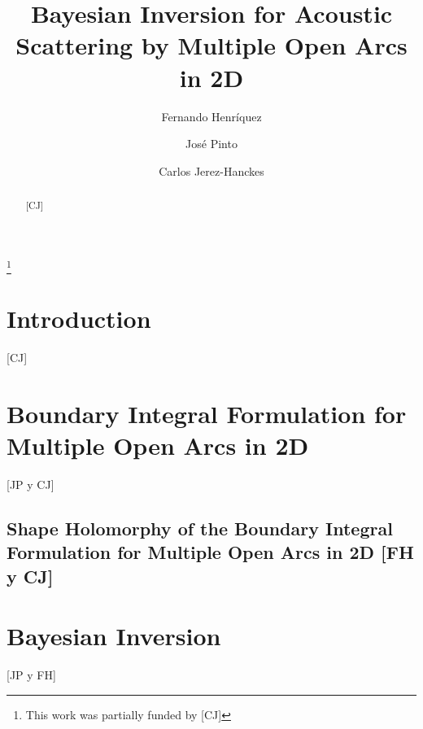 \documentclass[10pt,reqno]{amsart}
\theoremstyle{remark}
\newcommand{\com}[1]{{{\color{red} [#1]}}}
\numberwithin{equation}{section}
\begin{document}
\title[]{Bayesian Inversion for Acoustic Scattering by Multiple Open Arcs in 2D}
\author[Fernando Henr\'iquez]{Fernando Henr\'iquez} \address{Seminar for Applied Mathematics, ETH Z$\ddot{\mbox{u}}$rich, CH-8092
  Z$\ddot{\mbox{u}}$rich, Switzerland} 
\author[Jos\'e Pinto]{Jos\'e Pinto} \address{School of Engineering, Pontificia
  Universidad Cat\'olica de Chile, Santiago, Chile} 
\author[Carlos Jerez-Hanckes]{Carlos Jerez-Hanckes} \address{School of Engineering, Pontificia
  Universidad Cat\'olica de Chile, Santiago, Chile} 
  
\thanks{This work was partially funded by \com{CJ}}

\maketitle

\begin{abstract}
\com{CJ}


\end{abstract}

\newpage

\tableofcontents

\newpage

\section{Introduction}
\label{sec:intro}
\com{CJ}

\section{Boundary Integral Formulation for Multiple Open Arcs in 2D}
\label{sec:BIF_2D}

\com{JP y CJ}

\subsection{Shape Holomorphy of the Boundary Integral Formulation for Multiple Open Arcs in 2D {\com{FH y CJ}}}
\label{ssec:shape_hol}


\section{Bayesian Inversion}
\label{sec:bi}
\com{JP y FH}
\end{document}
